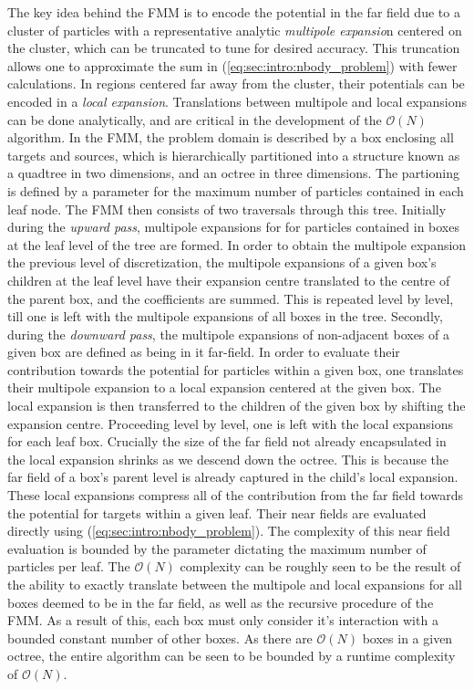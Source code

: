 \documentclass{IEEEcsmag}
\begin{document}
The key idea behind the FMM is to encode the potential in the far field due to a cluster of particles with a representative analytic \textit{multipole expansio}n centered on the cluster, which can be truncated to tune for desired accuracy. This truncation allows one to approximate the sum in (\ref{eq:sec:intro:nbody_problem}) with fewer calculations. In regions centered far away from the cluster, their potentials can be encoded in a \textit{local expansion}. Translations between multipole and local expansions can be done analytically, and are critical in the development of the $\mathcal{O}(N)$ algorithm. In the FMM, the problem domain is described by a box enclosing all targets and sources, which is hierarchically partitioned into a structure known as a quadtree in two dimensions, and an octree in three dimensions. The partioning is defined by a parameter for the maximum number of particles contained in each leaf node. The FMM then consists of two traversals through this tree.
Initially during the \textit{upward pass}, multipole expansions for for particles contained in boxes at the leaf level of the tree are formed. In order to obtain the multipole expansion the previous level of discretization, the multipole expansions of a given box's children at the leaf level have their expansion centre translated to the centre of the parent box, and the coefficients are summed. This is repeated level by level, till one is left with the multipole expansions of all boxes in the tree. Secondly, during the \textit{downward pass}, the multipole expansions of non-adjacent boxes of a given box are defined as being in it far-field. In order to evaluate their contribution towards the potential for particles within a given box, one translates their multipole expansion to a local expansion centered at the given box. The local expansion is then transferred to the children of the given box by shifting the expansion centre. Proceeding level by level, one is left with the local expansions for each leaf box. Crucially the size of the far field not already encapsulated in the local expansion shrinks as we descend down the octree. This is because the far field of a box's parent level is already captured in the child's local expansion. These local expansions compress all of the contribution from the far field towards the potential for targets within a given leaf. Their near fields are evaluated directly using (\ref{eq:sec:intro:nbody_problem}). The complexity of this near field evaluation is bounded by the parameter dictating the maximum number of particles per leaf. The $\mathcal{O}(N)$ complexity can be roughly seen to be the result of the ability to exactly translate between the multipole and local expansions for all boxes deemed to be in the far field, as well as the recursive procedure of the FMM. As a result of this, each box must only consider it's interaction with a bounded constant number of other boxes. As there are $\mathcal{O}(N)$ boxes in a given octree, the entire algorithm can be seen to be bounded by a runtime complexity of $\mathcal{O}(N)$.
\end{document}
